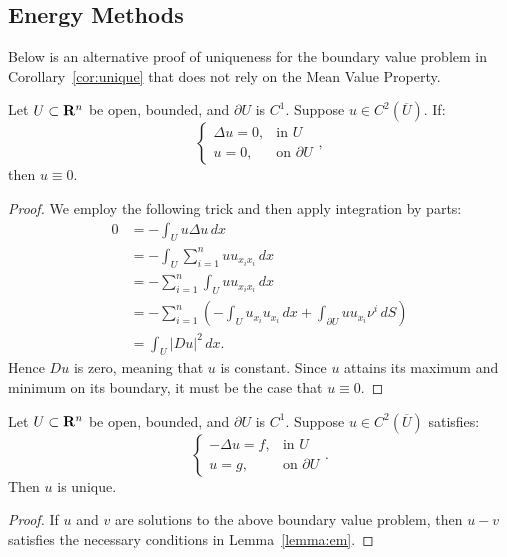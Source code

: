 \subsection{Energy Methods}

Below is an alternative proof of uniqueness for the boundary value problem in Corollary~\ref{cor:unique} that does not rely on the Mean Value Property.
\begin{lemma}\label{lemma:em}
	Let $U \subset \mathbf{R}^n$ be open, bounded, and $\partial U$ is $C^1$. Suppose $u \in C^2(\overline{U})$. If:
	\[
		\begin{cases}
			\Delta u =0,& \text{in } U \\
			u = 0,& \text{on } \partial U
		\end{cases},
	\]
	then $u \equiv 0$.
\end{lemma}
	\begin{proof}
		We employ the following trick and then apply integration by parts:
		\begin{align*}
			0
			&= - \int_{U}^{} u \Delta u\,dx \\
			&= - \int_{U}^{} \sum_{i=1}^{n} u u_{x_i x_i}\,dx \\
			&= -\sum_{i=1}^{n} \int_{U}^{} u u_{x_i x_i}\, dx \\
			&= -\sum_{i = 1}^{n} \left( -\int_{U}^{} u_{x_i}u_{x_i}\,dx + \int_{\partial U}^{} u u_{x_i}\nu^i\,dS \right)  \\
			&= \int_{U}^{} |Du|^2\,dx.
		\end{align*}
		Hence $Du$ is zero, meaning that $u$ is constant. Since $u$ attains its maximum and minimum on its boundary, it must be the case that $u \equiv 0$.
	\end{proof}

\begin{theorem}
	Let $U \subset \mathbf{R}^n$ be open, bounded, and $\partial U$ is $C^1$. Suppose $u \in C^2(\overline{U})$ satisfies:
	\[
		\begin{cases}
			-\Delta u = f, & \text{in } U \\
			u = g,& \text{on } \partial U	
		\end{cases}.
	\] 
	Then $u$ is unique.
\end{theorem}
	\begin{proof}
		If $u$ and $v$ are solutions to the above boundary value problem, then $u-v$ satisfies the necessary conditions in Lemma~\ref{lemma:em}. 
	\end{proof}

